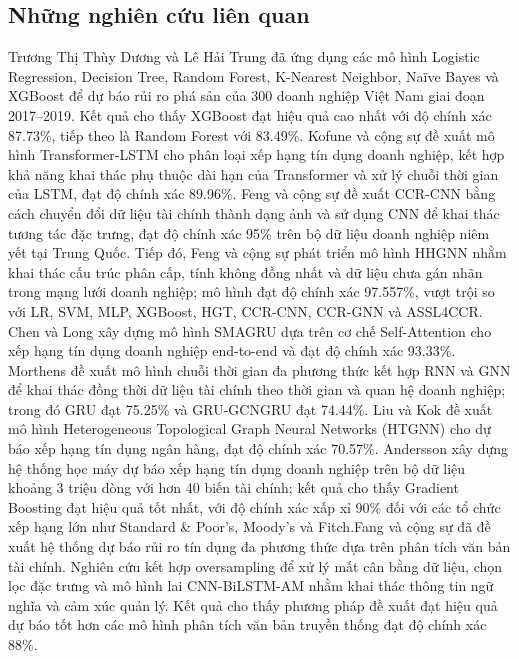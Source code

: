 \documentclass[10pt,twoside]{article}
\begin{document}
\subsection{Những nghiên cứu liên quan}
Trương Thị Thùy Dương và Lê Hải Trung \cite{thuy_ung_2023} đã ứng dụng các mô hình Logistic Regression, Decision Tree, Random Forest, K-Nearest Neighbor, Naïve Bayes và XGBoost để dự báo rủi ro phá sản của 300 doanh nghiệp Việt Nam giai đoạn 2017–2019. Kết quả cho thấy XGBoost đạt hiệu quả cao nhất với độ chính xác 87.73\%, tiếp theo là Random Forest với 83.49\%. Kofune và cộng sự \cite{kofune_enhancing_2026} đề xuất mô hình Transformer-LSTM cho phân loại xếp hạng tín dụng doanh nghiệp, kết hợp khả năng khai thác phụ thuộc dài hạn của Transformer và xử lý chuỗi thời gian của LSTM, đạt độ chính xác 89.96\%. Feng và cộng sự \cite{feng_every_2020} đề xuất CCR-CNN bằng cách chuyển đổi dữ liệu tài chính thành dạng ảnh và sử dụng CNN để khai thác tương tác đặc trưng, đạt độ chính xác 95\% trên bộ dữ liệu doanh nghiệp niêm yết tại Trung Quốc. Tiếp đó, Feng và cộng sự \cite{feng_corporate_2024} phát triển mô hình HHGNN nhằm khai thác cấu trúc phân cấp, tính không đồng nhất và dữ liệu chưa gán nhãn trong mạng lưới doanh nghiệp; mô hình đạt độ chính xác 97.557\%, vượt trội so với LR, SVM, MLP, XGBoost, HGT, CCR-CNN, CCR-GNN và ASSL4CCR. Chen và Long \cite{chen_novel_2020} xây dựng mô hình SMAGRU dựa trên cơ chế Self-Attention cho xếp hạng tín dụng doanh nghiệp end-to-end và đạt độ chính xác 93.33\%. Morthens \cite{morthens_credit_nodate} đề xuất mô hình chuỗi thời gian đa phương thức kết hợp RNN và GNN để khai thác đồng thời dữ liệu tài chính theo thời gian và quan hệ doanh nghiệp; trong đó GRU đạt 75.25\% và GRU-GCNGRU đạt 74.44\%. Liu và Kok \cite{liu_prediction_2025} đề xuất mô hình Heterogeneous Topological Graph Neural Networks (HTGNN) cho dự báo xếp hạng tín dụng ngân hàng, đạt độ chính xác 70.57\%. Andersson \cite{andersson_masters_nodate} xây dựng hệ thống học máy dự báo xếp hạng tín dụng doanh nghiệp trên bộ dữ liệu khoảng 3 triệu dòng với hơn 40 biến tài chính; kết quả cho thấy Gradient Boosting đạt hiệu quả tốt nhất, với độ chính xác xấp xỉ 90\% đối với các tổ chức xếp hạng lớn như Standard \& Poor's, Moody's và Fitch.Fang và cộng sự \cite{fang_design_2025} đã đề xuất hệ thống dự báo rủi ro tín dụng đa phương thức dựa trên phân tích văn bản tài chính. Nghiên cứu kết hợp oversampling để xử lý mất cân bằng dữ liệu, chọn lọc đặc trưng và mô hình lai CNN-BiLSTM-AM nhằm khai thác thông tin ngữ nghĩa và cảm xúc quản lý. Kết quả cho thấy phương pháp đề xuất đạt hiệu quả dự báo tốt hơn các mô hình phân tích văn bản truyền thống đạt độ chính xác 88\%.
\end{document}
